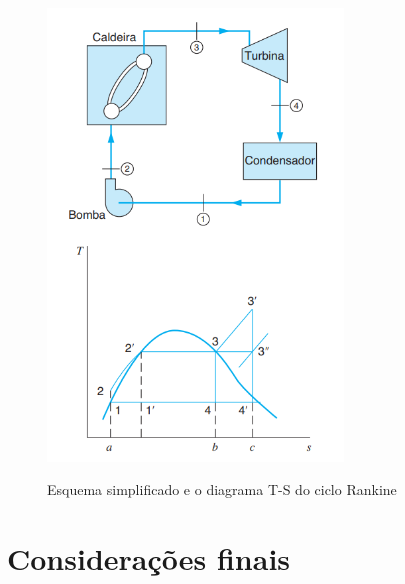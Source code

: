 \documentclass[
	article,			%
	11pt,				%
	oneside,			%
	a4paper,			%
	english,			%
	brazil,				%
	sumario=tradicional
	]{abntex2}
\begin{document}
\begin{figure}[h]
	\centering
	\caption{Esquema simplificado e o diagrama T-S do ciclo Rankine}
	\includegraphics[width=0.7\textwidth]{./images/Esquema simplificado e o diagrama T-S do ciclo Rankine.png}
	\label{fig:esquema-simplificado-ciclo-rankine}
\end{figure}

%

\section{Considerações finais}

\postextual

\clearpage

\end{document}
